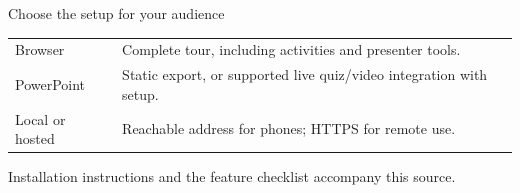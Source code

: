 \documentclass[aspectratio=169,11pt]{beamer}
\newcommand{\smallgap}{\par\vspace{4mm}}
\begin{document}
\begin{frame}{Choose the setup for your audience}
  \begin{tabular}{@{}p{.25\linewidth}p{.66\linewidth}@{}}
    \toprule
    Browser & Complete tour, including activities and presenter tools.\\[2mm]
    PowerPoint & Static export, or supported live quiz/video integration with setup.\\[2mm]
    Local or hosted & Reachable address for phones; HTTPS for remote use.\\
    \bottomrule
  \end{tabular}
  \smallgap Installation instructions and the feature checklist accompany this source.
\end{frame}
\end{document}
